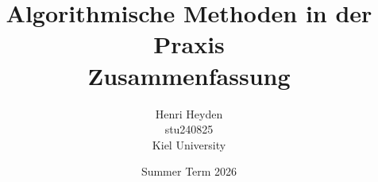 


\title{Algorithmische Methoden in der Praxis \\ \small Zusammenfassung}
\date{Summer Term 2026}
\author{Henri Heyden \\%
    \small stu240825 \\%
    \small Kiel University%
}


\maketitle
\restoregeometry

\tableofcontents



